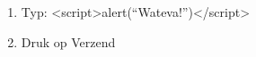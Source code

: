 \begin{enumerate}
  \item Typ: \textless script\textgreater alert(``Wateva!'')\textless /script\textgreater
  \item Druk op Verzend
\end{enumerate}